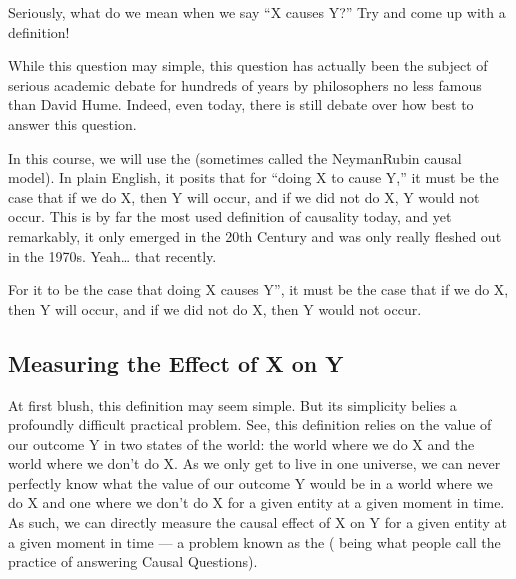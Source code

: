\documentclass[letterpaper,10pt,english]{jupyterBook}
\begin{document}
\sphinxAtStartPar
Seriously, what do we mean when we say “X causes Y?” Try and come up with a definition!

\sphinxAtStartPar
While this question may  simple, this question has actually been the subject of serious academic debate for hundreds of years by philosophers no less famous than David Hume. Indeed, even today, there is still debate over how best to answer this question.

\sphinxAtStartPar
In this course, we will use the  (sometimes called the Neyman\sphinxhyphen{}Rubin causal model). In plain English, it posits that for “doing X to cause Y,” it must be the case that if we do X, then Y will occur, and if we did not do X, Y would not occur. This is by far the most used definition of causality today, and yet remarkably, it only emerged in the 20th Century and was only really fleshed out in the 1970s. Yeah… that recently.

\begin{sphinxShadowBox}

\sphinxAtStartPar
For it to be the case that doing X causes Y”, it must be the case that if we do X, then Y will occur, and if we did not do X, then Y would not occur.
\end{sphinxShadowBox}


\subsection{Measuring the Effect of X on Y}
\label{\detokenize{30_questions/40_answering_causal_questions:measuring-the-effect-of-x-on-y}}
\sphinxAtStartPar
At first blush, this definition may seem simple. But its simplicity belies a profoundly difficult practical problem. See, this definition relies on  the value of our outcome Y in two states of the world: the world where we do X and the world where we don’t do X. As we only get to live in one universe, we can never perfectly know what the value of our outcome Y would be in  a world where we do X and one where we don’t do X for a given entity at a given moment in time. As such, we can  directly measure the causal effect of X on Y for a given entity at a given moment in time — a problem known as the  ( being what people call the practice of answering Causal Questions).
\end{document}
